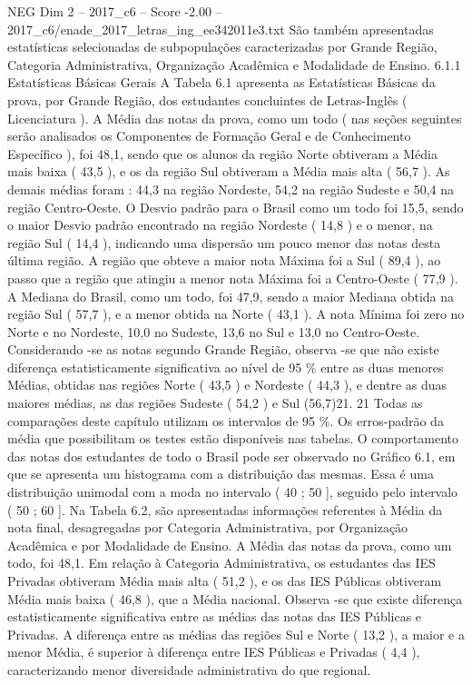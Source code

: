 \begin{textsample}{NEG Dim 2 – 2017\_c6 – Score -2.00 – 2017\_c6/enade\_2017\_letras\_ing\_ee342011e3.txt}
São também apresentadas estatísticas selecionadas de subpopulações caracterizadas por Grande Região, Categoria Administrativa, Organização Acadêmica e Modalidade de Ensino. 6.1.1 Estatísticas Básicas Gerais A Tabela 6.1 apresenta as Estatísticas Básicas da prova, por Grande Região, dos estudantes concluintes de Letras-Inglês ( Licenciatura ).
A Média das notas da prova, como um todo ( nas seções seguintes serão analisados os Componentes de Formação Geral e de Conhecimento Específico ), foi 48,1, sendo que os alunos da região Norte obtiveram a Média mais baixa ( 43,5 ), e os da região Sul obtiveram a Média mais alta ( 56,7 ).
As demais médias foram : 44,3 na região Nordeste, 54,2 na região Sudeste e 50,4 na região Centro-Oeste.
O Desvio padrão para o Brasil como um todo foi 15,5, sendo o maior Desvio padrão encontrado na região Nordeste ( 14,8 ) e o menor, na região Sul ( 14,4 ), indicando uma dispersão um pouco menor das notas desta última região.
A região que obteve a maior nota Máxima foi a Sul ( 89,4 ), ao passo que a região que atingiu a menor nota Máxima foi a Centro-Oeste ( 77,9 ).
A Mediana do Brasil, como um todo, foi 47,9, sendo a maior Mediana obtida na região Sul ( 57,7 ), e a menor obtida na Norte ( 43,1 ).
A nota Mínima foi zero no Norte e no Nordeste, 10,0 no Sudeste, 13,6 no Sul e 13,0 no Centro-Oeste.
Considerando -se as notas segundo Grande Região, observa -se que não existe diferença estatisticamente significativa ao nível de 95 \% entre as duas menores Médias, obtidas nas regiões Norte ( 43,5 ) e Nordeste ( 44,3 ), e dentre as duas maiores médias, as das regiões Sudeste ( 54,2 ) e Sul (56,7)21. 21 Todas as comparações deste capítulo utilizam os intervalos de 95 \%.
Os erros-padrão da média que possibilitam os testes estão disponíveis nas tabelas.
O comportamento das notas dos estudantes de todo o Brasil pode ser observado no Gráfico 6.1, em que se apresenta um histograma com a distribuição das mesmas.
Essa é uma distribuição unimodal com a moda no intervalo ( 40 ; 50 ], seguido pelo intervalo ( 50 ; 60 ].
Na Tabela 6.2, são apresentadas informações referentes à Média da nota final, desagregadas por Categoria Administrativa, por Organização Acadêmica e por Modalidade de Ensino.
A Média das notas da prova, como um todo, foi 48,1.
Em relação à Categoria Administrativa, os estudantes das IES Privadas obtiveram Média mais alta ( 51,2 ), e os das IES Públicas obtiveram Média mais baixa ( 46,8 ), que a Média nacional.
Observa -se que existe diferença estatisticamente significativa entre as médias das notas das IES Públicas e Privadas.
A diferença entre as médias das regiões Sul e Norte ( 13,2 ), a maior e a menor Média, é superior à diferença entre IES Públicas e Privadas ( 4,4 ), caracterizando menor diversidade administrativa do que regional.

\end{textsample}
